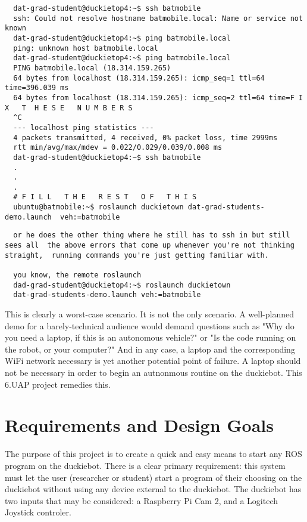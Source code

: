 \documentclass[titlepage]{article}
\begin{document}
\begin{lstlisting}
  dat-grad-student@duckietop4:~$ ssh batmobile
  ssh: Could not resolve hostname batmobile.local: Name or service not known
  dat-grad-student@duckietop4:~$ ping batmobile.local
  ping: unknown host batmobile.local
  dat-grad-student@duckietop4:~$ ping batmobile.local
  PING batmobile.local (18.314.159.265)
  64 bytes from localhost (18.314.159.265): icmp_seq=1 ttl=64 time=396.039 ms
  64 bytes from localhost (18.314.159.265): icmp_seq=2 ttl=64 time=F I X   T  H E S E   N U M B E R S
  ^C
  --- localhost ping statistics ---
  4 packets transmitted, 4 received, 0% packet loss, time 2999ms
  rtt min/avg/max/mdev = 0.022/0.029/0.039/0.008 ms
  dat-grad-student@duckietop4:~$ ssh batmobile
  .
  .
  .
  # F I L L   T H E   R E S T   O F   T H I S
  ubuntu@batmobile:~$ roslaunch duckietown dat-grad-students-demo.launch  veh:=batmobile
 \end{lstlisting}
 \begin{lstlisting}
  or he does the other thing where he still has to ssh in but still sees all  the above errors that come up whenever you're not thinking straight,  running commands you're just getting familiar with. 
 
  you know, the remote roslaunch
  dad-grad-student@duckietop4:~$ roslaunch duckietown
  dat-grad-students-demo.launch veh:=batmobile
\end{lstlisting}

This is clearly a worst-case scenario. It is not the only scenario. A well-planned demo for a barely-technical audience would demand questions such as "Why do you need a laptop, if this is an autonomous vehicle?" or "Is the code running on the robot, or your computer?" And in any case, a laptop and the corresponding WiFi network necessary is yet another potential point of failure. A laptop should not be necessary in order to begin an autnonmous routine on the duckiebot. This 6.UAP project remedies this. 
\section{Requirements and Design Goals}
The purpose of this project is to create a quick and easy means to start any ROS program on the duckiebot. There is a clear primary requirement: this system must let the user (researcher or student) start a program of their choosing on the duckiebot without using any device external to the duckiebot. The duckiebot has two inputs that may be considered: a Raspberry Pi Cam 2, and a Logitech Joystick controler. 
\end{document}
